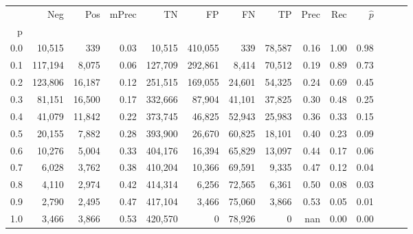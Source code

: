 \begin{tabular}{rrrrrrrrrrrrrr}
\toprule
{} &      Neg &     Pos & mPrec &       TN &       FP &      FN &      TP &  Prec &   Rec & $\hat{p}$ \\
p   &          &         &       &          &          &         &         &       &       &           \\
\midrule
0.0 &   10,515 &     339 &  0.03 &   10,515 &  410,055 &     339 &  78,587 &  0.16 &  1.00 &      0.98 \\
0.1 &  117,194 &   8,075 &  0.06 &  127,709 &  292,861 &   8,414 &  70,512 &  0.19 &  0.89 &      0.73 \\
0.2 &  123,806 &  16,187 &  0.12 &  251,515 &  169,055 &  24,601 &  54,325 &  0.24 &  0.69 &      0.45 \\
0.3 &   81,151 &  16,500 &  0.17 &  332,666 &   87,904 &  41,101 &  37,825 &  0.30 &  0.48 &      0.25 \\
0.4 &   41,079 &  11,842 &  0.22 &  373,745 &   46,825 &  52,943 &  25,983 &  0.36 &  0.33 &      0.15 \\
0.5 &   20,155 &   7,882 &  0.28 &  393,900 &   26,670 &  60,825 &  18,101 &  0.40 &  0.23 &      0.09 \\
0.6 &   10,276 &   5,004 &  0.33 &  404,176 &   16,394 &  65,829 &  13,097 &  0.44 &  0.17 &      0.06 \\
0.7 &    6,028 &   3,762 &  0.38 &  410,204 &   10,366 &  69,591 &   9,335 &  0.47 &  0.12 &      0.04 \\
0.8 &    4,110 &   2,974 &  0.42 &  414,314 &    6,256 &  72,565 &   6,361 &  0.50 &  0.08 &      0.03 \\
0.9 &    2,790 &   2,495 &  0.47 &  417,104 &    3,466 &  75,060 &   3,866 &  0.53 &  0.05 &      0.01 \\
1.0 &    3,466 &   3,866 &  0.53 &  420,570 &        0 &  78,926 &       0 &   nan &  0.00 &      0.00 \\
\bottomrule
\end{tabular}
